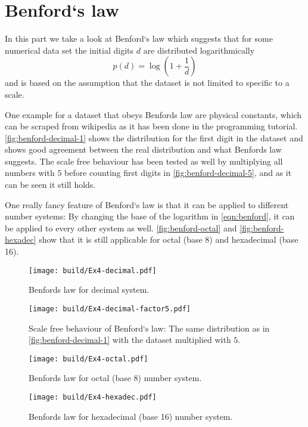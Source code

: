 \section{Benford`s law}
\label{sec:exercise-4}
In this part we take a look at Benford`s law which suggests that for some numerical data set the initial digits $d$ are
distributed logarithmically
\begin{equation}
  p(d) = \log\left(1 + \frac{1}{d}\right)
  \label{eqn:benford}
\end{equation}
and is based on the assumption that the dataset is not limited to specific to a scale.
%
%
%
%

One example for a dataset that obeys Benfords law are physical constants, which can be scraped from wikipedia as it has
been done in the programming tutorial. \autoref{fig:benford-decimal-1} shows the distribution for the first digit in the
dataset and shows good agreement between the real distribution and what Benfords law suggests. The scale free behaviour
has been tested as well by multiplying all numbers with $5$ before counting first digits in
\autoref{fig:benford-decimal-5}, and as it can be seen it still holds.

One really fancy feature of Benford`s law is that it can be applied to different number systems: By changing the base of
the logarithm in \autoref{eqn:benford}, it can be applied to every other system as well. \autoref{fig:benford-octal} and
\autoref{fig:benford-hexadec} show that it is still applicable for octal (base 8) and hexadecimal (base 16).
\begin{figure}
	\centering
  \texttt{[image: build/Ex4-decimal.pdf]}
  \caption{Benfords law for decimal system.}
  \label{fig:benford-decimal-1}
\end{figure}
\begin{figure}
	\centering
  \texttt{[image: build/Ex4-decimal-factor5.pdf]}
  \caption{Scale free behaviour of Benford`s law: The same distribution as in \autoref{fig:benford-decimal-1} with the
  dataset multiplied with $5$.}
  \label{fig:benford-decimal-5}
\end{figure}
\begin{figure}
	\centering
  \texttt{[image: build/Ex4-octal.pdf]}
  \caption{Benfords law for octal (base 8) number system.}
  \label{fig:benford-octal}
\end{figure}
\begin{figure}
	\centering
  \texttt{[image: build/Ex4-hexadec.pdf]}
  \caption{Benfords law for hexadecimal (base 16) number system.}
  \label{fig:benford-hexadec}
\end{figure}


